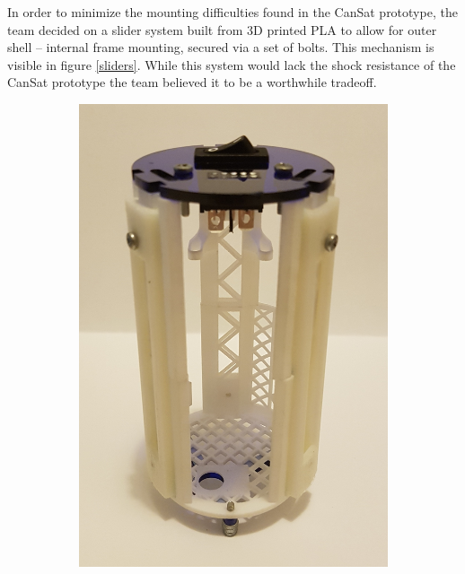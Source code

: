 \documentclass[]{report}
\begin{document}
		In order to minimize the mounting difficulties found in the CanSat prototype, the team decided on a slider system built from 3D printed PLA to allow for outer shell – internal frame mounting, secured via a set of bolts. This mechanism is visible in figure \ref{sliders}. While this system would lack the shock resistance of the CanSat prototype the team believed it to be a worthwhile tradeoff. 
		
		\begin{figure}
			\centering
			\begin{subfigure}{.5\textwidth}
				\centering
				\includegraphics[width=.7\linewidth]{bareframe.jpg}
			\end{subfigure}%
			\begin{subfigure}{.5\textwidth}
				\centering

\end{subfigure}
\end{figure}
\end{document}

